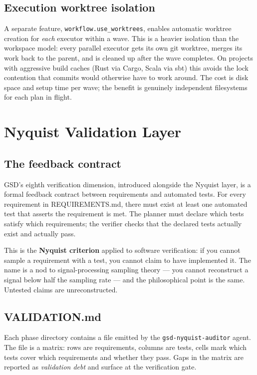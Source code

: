 \documentclass[11pt,letterpaper,openany]{book}
\begin{document}
\section{Execution worktree isolation}

A separate feature, \texttt{workflow.use\_worktrees}, enables automatic worktree creation for \emph{each} executor within a wave. This is a heavier isolation than the workspace model: every parallel executor gets its own git worktree, merges its work back to the parent, and is cleaned up after the wave completes. On projects with aggressive build caches (Rust via Cargo, Scala via sbt) this avoids the lock contention that  commits would otherwise have to work around. The cost is disk space and setup time per wave; the benefit is genuinely independent filesystems for each plan in flight.

\chapter{Nyquist Validation Layer}

\section{The feedback contract}

GSD's eighth verification dimension, introduced alongside the Nyquist layer, is a formal feedback contract between requirements and automated tests. For every requirement in REQUIREMENTS.md, there must exist at least one automated test that asserts the requirement is met. The planner must declare which tests satisfy which requirements; the verifier checks that the declared tests actually exist and actually pass.

This is the \textbf{Nyquist criterion} applied to software verification: if you cannot sample a requirement with a test, you cannot claim to have implemented it. The name is a nod to signal-processing sampling theory — you cannot reconstruct a signal below half the sampling rate — and the philosophical point is the same. Untested claims are unreconstructed.

\section{VALIDATION.md}

Each phase directory contains a  file emitted by the \texttt{gsd-nyquist-auditor} agent. The file is a matrix: rows are requirements, columns are tests, cells mark which tests cover which requirements and whether they pass. Gaps in the matrix are reported as \textit{validation debt} and surface at the verification gate.
\end{document}
